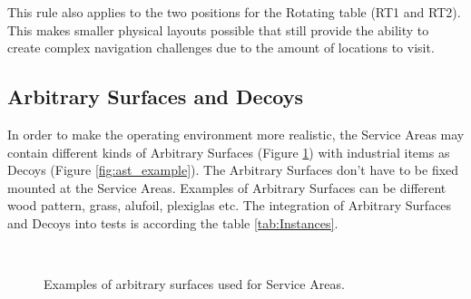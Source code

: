 This rule also applies to the two positions for the Rotating table (RT1 and RT2).
This makes smaller physical layouts possible that still provide the ability to create complex navigation challenges due to the amount of locations to visit.


\subsection{Arbitrary Surfaces and Decoys}
\label{subsec:Arbitrary_Surfaces_and_Decoys}

In order to make the operating environment more realistic, the Service Areas may contain different kinds of Arbitrary Surfaces (Figure \ref{fig:ast_surface_example}) with industrial items as Decoys (Figure \ref{fig:ast_example}). The Arbitrary Surfaces don't have to be fixed mounted at the Service Areas. Examples of Arbitrary Surfaces can be different wood pattern, grass, alufoil, plexiglas etc. The integration of Arbitrary Surfaces and Decoys into tests is according the table \ref{tab:Instances}.


\begin{figure}[h!]
	\centering
	\hspace{.05\textwidth}
	\hspace{.05\textwidth}
	\\
	\hspace{.05\textwidth}
	\caption{Examples of arbitrary surfaces used for Service Areas.}
	\label{fig:ast_surface_example}
\end{figure}

